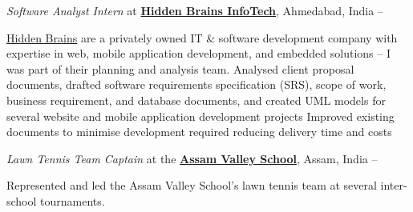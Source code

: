\documentclass[a4paper,10pt,oneside]{article}
\begin{document}
\begin{body}
\BigEntryGapNoBreak
\textit{Software Analyst Intern} at
\href{http://www.hiddenbrains.com/}
{\textbf{Hidden Brains InfoTech}},
Ahmedabad, India
\hfill
{} --
\EntryGapNoBreak
\begin{detailwithoutsubheading}
\href{http://www.hiddenbrains.com/}{Hidden Brains} are a privately owned IT \& software development company with expertise in web, mobile application development, and embedded solutions -- I was part of their planning and analysis team.
\BulletItem
Analysed client proposal documents, drafted software requirements specification (SRS), scope of work, business requirement, and database documents, and created UML models for several website and mobile application development projects
\BulletItem
Improved existing documents to minimise development required reducing delivery time and costs
\end{detailwithoutsubheading}

\BigEntryGapNoBreak
\textit{Lawn Tennis Team Captain} at the \href{http://www.assamvalleyschool.com}{\textbf{Assam Valley School}},
Assam, India
\hfill
{} --
\begin{detailwithoutsubheading}
\BulletItem
Represented and led the Assam Valley School's lawn tennis team at several inter-school tournaments.
\end{detailwithoutsubheading}
\vspace{-5pt}
\hline


\end{body}
\end{document}

